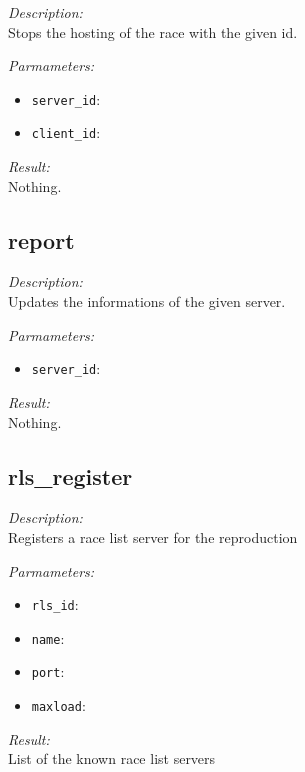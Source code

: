 \begin{description}
\item {\it Description:}\\
Stops the hosting of the race with the given id.
\item {\it Parmameters:}
\begin{itemize}
\item {\tt server\_id}: 
\item {\tt client\_id}: 
\end{itemize}
\item {\it Result:}\\
Nothing.
\end{description}

\subsection{report}

\begin{description}
\item {\it Description:}\\
Updates the informations of the given server.
\item {\it Parmameters:}
\begin{itemize}
\item {\tt server\_id}: 
\end{itemize}
\item {\it Result:}\\
Nothing.
\end{description}

\subsection{rls\_register}

\begin{description}
\item {\it Description:}\\
Registers a race list server for the reproduction
\item {\it Parmameters:}
\begin{itemize}
\item {\tt rls\_id}: 
\item {\tt name}: 
\item {\tt port}: 
\item {\tt maxload}: 
\end{itemize}
\item {\it Result:}\\
List of the known race list servers
\end{description}

